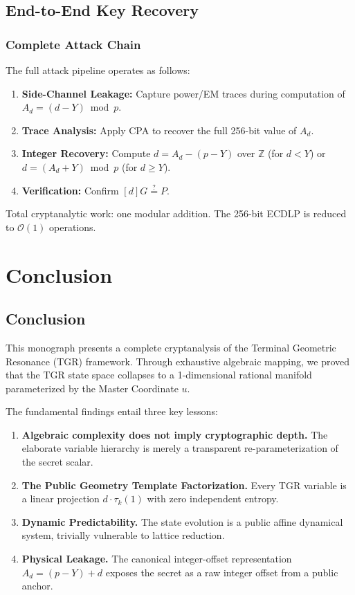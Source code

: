 \documentclass[11pt, a4paper, twoside]{book}
\begin{document}
\chapter{End-to-End Key Recovery}

\section{Complete Attack Chain}
The full attack pipeline operates as follows:
\begin{enumerate}
    \item \textbf{Side-Channel Leakage:} Capture power/EM traces during computation of $A_d = (d - Y) \bmod p$.
    \item \textbf{Trace Analysis:} Apply CPA to recover the full 256-bit value of $A_d$.
    \item \textbf{Integer Recovery:} Compute $d = A_d - (p - Y)$ over $\mathbb{Z}$ (for $d < Y$) or $d = (A_d + Y) \bmod p$ (for $d \geq Y$).
    \item \textbf{Verification:} Confirm $[d]G \stackrel{?}{=} P$.
\end{enumerate}

Total cryptanalytic work: one modular addition. The 256-bit ECDLP is reduced to $\mathcal{O}(1)$ operations.

\part{Conclusion}

\chapter{Conclusion}

This monograph presents a complete cryptanalysis of the Terminal Geometric Resonance (TGR) framework. Through exhaustive algebraic mapping, we proved that the TGR state space collapses to a 1-dimensional rational manifold parameterized by the Master Coordinate $u$. 

The fundamental findings entail three key lessons:
\begin{enumerate}
    \item \textbf{Algebraic complexity does not imply cryptographic depth.} The elaborate variable hierarchy is merely a transparent re-parameterization of the secret scalar.
    \item \textbf{The Public Geometry Template Factorization.} Every TGR variable is a linear projection $d \cdot \tau_k(1)$ with zero independent entropy.
    \item \textbf{Dynamic Predictability.} The state evolution is a public affine dynamical system, trivially vulnerable to lattice reduction.
    \item \textbf{Physical Leakage.} The canonical integer-offset representation $A_d = (p - Y) + d$ exposes the secret as a raw integer offset from a public anchor.
\end{enumerate}
\end{document}
